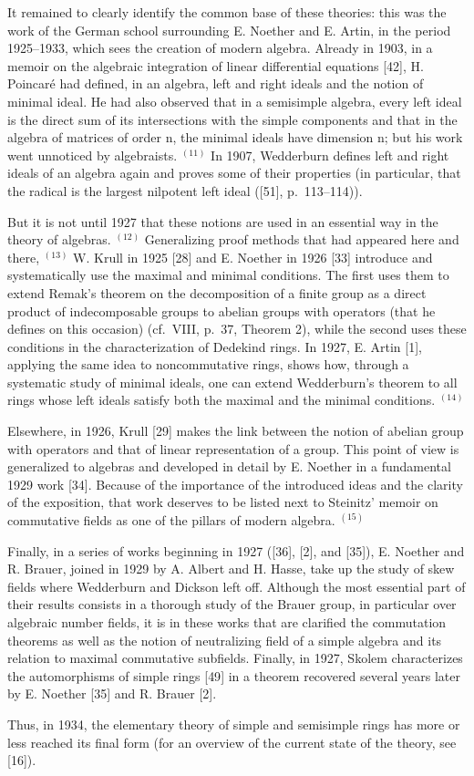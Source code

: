 It remained to clearly identify the common base of these theories: this was the work of the German school surrounding E. Noether and E. Artin, in the period 1925--1933, which sees the creation of modern algebra. Already in 1903, in a memoir on the algebraic integration of linear differential equations {[}42{]}, H. Poincaré had defined, in an algebra, left and right ideals and the notion of minimal ideal. He had also observed that in a semisimple algebra, every left ideal is the direct sum of its intersections with the simple components and that in the algebra of matrices of order n, the minimal ideals have dimension n; but his work went unnoticed by algebraists. \(^{(11)}\) In 1907, Wedderburn defines left and right ideals of an algebra again and proves some of their properties (in particular, that the radical is the largest nilpotent left ideal ({[}51{]}, p.~113--114)).

But it is not until 1927 that these notions are used in an essential way in the theory of algebras. \(^{(12)}\) Generalizing proof methods that had appeared here and there, \(^{(13)}\) W. Krull in 1925 {[}28{]} and E. Noether in 1926 {[}33{]} introduce and systematically use the maximal and minimal conditions. The first uses them to extend Remak's theorem on the decomposition of a finite group as a direct product of indecomposable groups to abelian groups with operators (that he defines on this occasion) (cf.~VIII, p.~37, Theorem 2), while the second uses these conditions in the characterization of Dedekind rings. In 1927, E. Artin {[}1{]}, applying the same idea to noncommutative rings, shows how, through a systematic study of minimal ideals, one can extend Wedderburn's theorem to all rings whose left ideals satisfy both the maximal and the minimal conditions. \(^{(14)}\)

Elsewhere, in 1926, Krull {[}29{]} makes the link between the notion of abelian group with operators and that of linear representation of a group. This point of view is generalized to algebras and developed in detail by E. Noether in a fundamental 1929 work {[}34{]}. Because of the importance of the introduced ideas and the clarity of the exposition, that work deserves to be listed next to Steinitz' memoir on commutative fields as one of the pillars of modern algebra. \(^{(15)}\)

Finally, in a series of works beginning in 1927 ({[}36{]}, {[}2{]}, and {[}35{]}), E. Noether and R. Brauer, joined in 1929 by A. Albert and H. Hasse, take up the study of skew fields where Wedderburn and Dickson left off. Although the most essential part of their results consists in a thorough study of the Brauer group, in particular over algebraic number fields, it is in these works that are clarified the commutation theorems as well as the notion of neutralizing field of a simple algebra and its relation to maximal commutative subfields. Finally, in 1927, Skolem characterizes the automorphisms of simple rings {[}49{]} in a theorem recovered several years later by E. Noether {[}35{]} and R. Brauer {[}2{]}.

Thus, in 1934, the elementary theory of simple and semisimple rings has more or less reached its final form (for an overview of the current state of the theory, see {[}16{]}).
